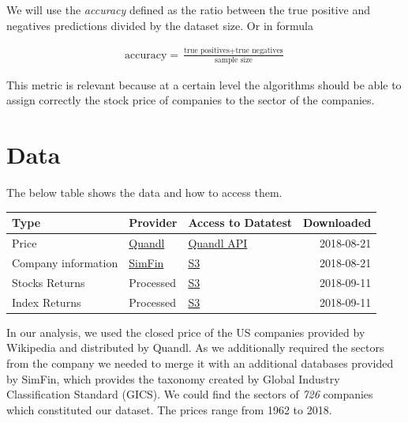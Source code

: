 \documentclass[a4paper,twoside]{article}
\begin{document}
We will use the \emph{accuracy} defined as the ratio between the true positive and
negatives predictions divided by the dataset size. Or in formula

\begin{align*}
  \textrm{accuracy} = \frac{\textrm{true positives} + \textrm{true negatives}}{\textrm{sample size}}
\end{align*}

This metric is relevant because at a certain level the algorithms should be
able to assign correctly the stock price of companies to the sector of the
companies.


\section{Data}
\label{sec:org81b92f9}

The below table shows the data and how to access them.

\begin{center}
\begin{tabular}{lllr}
Type & Provider & Access to Datatest & Downloaded\\
\hline
Price & \href{https://www.quandl.com/databases/WIKIP/documentation/about}{Quandl} & \href{https://www.quandl.com/databases/WIKIP}{Quandl API} & 2018-08-21\\
Company information & \href{https://simfin.com/data/find/}{SimFin} & \href{https://s3.us-east-2.amazonaws.com/udacity-capstone-data-davidpham87/data/company\_fundamentals.csv}{S3} & 2018-08-21\\
Stocks Returns & Processed & \href{https://s3.us-east-2.amazonaws.com/udacity-capstone-data-davidpham87/data/wiki\_indices\_returns.csv}{S3} & 2018-09-11\\
Index Returns & Processed & \href{https://s3.us-east-2.amazonaws.com/udacity-capstone-data-davidpham87/data/wiki\_stocks\_returns.csv}{S3} & 2018-09-11\\
\hline
\end{tabular}
\end{center}

In our analysis, we used the closed price of the US companies provided by
Wikipedia and distributed by Quandl. As we additionally required the sectors
from the company we needed to merge it with an additional databases provided by
SimFin, which provides the taxonomy created by Global Industry Classification
Standard (GICS). We could find the sectors of \emph{726} companies which
constituted our dataset. The prices range from 1962 to 2018.
\end{document}
